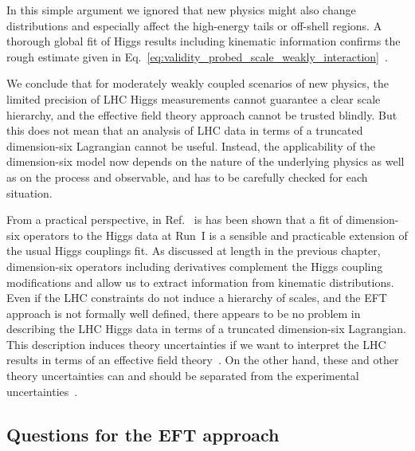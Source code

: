 In this simple argument we ignored that new physics might also change
distributions and especially affect the high-energy tails or off-shell
regions.
%
%
A thorough global fit of Higgs results including kinematic information
confirms the rough estimate given in
Eq.~\eqref{eq:validity_probed_scale_weakly_interaction}~\cite{Corbett:2015ksa}.

We conclude that for moderately weakly coupled scenarios of new
physics, the limited precision of LHC Higgs measurements cannot
guarantee a clear scale hierarchy, and the effective field theory
approach cannot be trusted blindly. But this does not mean that an
analysis of LHC data in terms of a truncated dimension-six Lagrangian
cannot be useful. Instead, the applicability of the dimension-six
model now depends on the nature of the underlying physics as well as
on the process and observable, and has to be carefully checked for
each situation.

From a practical perspective, in Ref.~\cite{Corbett:2015ksa} is has
been shown that a fit of dimension-six operators to the Higgs data at
Run~I is a sensible and practicable extension of the usual Higgs
couplings fit.  As discussed at length in the previous chapter,
dimension-six operators including derivatives complement the Higgs
coupling modifications and allow us to extract information from
kinematic distributions. Even if the LHC constraints do not induce a
hierarchy of scales, and the EFT approach is not formally well
defined, there appears to be no problem in describing the LHC Higgs
data in terms of a truncated dimension-six Lagrangian. This
description induces theory uncertainties if we want to interpret the
LHC results in terms of an effective field
theory~\cite{Berthier:2015gja}. On the other hand, these and other
theory uncertainties can and should be separated from the experimental
uncertainties~\cite{Cranmer:2013hia, Fichet:2015xla}.



\subsection{Questions for the EFT approach}

